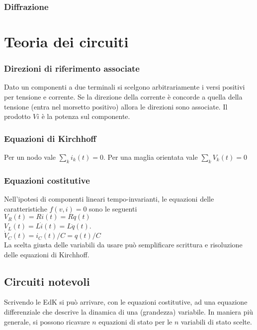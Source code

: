\documentclass[11pt,a4paper]{article}
\begin{document}
\subsubsection{Diffrazione}

	\section{Teoria dei circuiti}
\subsubsection{Direzioni di riferimento associate}
Dato un componenti a due terminali si scelgono arbitrariamente i versi positivi per tensione e corrente. Se la direzione della corrente è concorde a quella della tensione (entra nel morsetto positivo) allora le direzioni sono associate. Il prodotto $Vi$ è la potenza sul componente.

\subsubsection{Equazioni di Kirchhoff}
Per un nodo vale $\sum_k i_k(t) = 0$. Per una maglia orientata vale $\sum_k V_k(t) = 0$

\subsubsection{Equazioni costitutive}
Nell'ipotesi di componenti lineari tempo-invarianti, le equazioni delle caratteristiche $f(v,i)=0$ sono le seguenti\\
$V_R(t) = Ri(t) = R\dot q(t)$\\
$V_L(t) = L\dot i(t) = L\ddot q(t)$.\\
$\dot V_C(t) = i_C(t)/C = q(t)/C$\\
La scelta giusta delle variabili da usare può semplificare scrittura e risoluzione delle equazioni di Kirchhoff.

\subsection{Circuiti notevoli}
Scrivendo le EdK si può arrivare, con le equazioni costitutive, ad una equazione differenziale che descrive la dinamica di una (grandezza) variabile. In maniera più generale, si possono ricavare $n$ equazioni di stato per le $n$ variabili di stato scelte.
\end{document}
